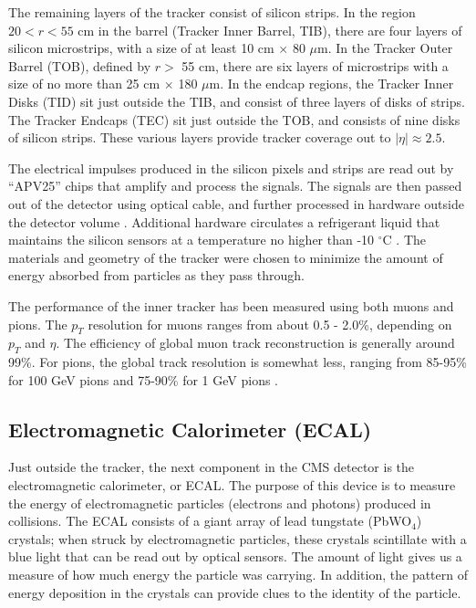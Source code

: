 The remaining layers of the tracker consist of silicon strips. In the
region $20 < r < 55$ cm in the barrel (Tracker Inner Barrel, TIB),
there are four layers of silicon
microstrips, with a size of at least 10 cm $\times$ 80 $\mu$m. In the
Tracker Outer Barrel (TOB), defined by $r >$ 55 cm, there are six
layers of microstrips with a size of no more than 25 cm $\times$
180 $\mu$m. In the endcap regions, the Tracker Inner Disks (TID) sit
just outside the TIB, and consist of three layers of disks of
strips. The Tracker Endcaps (TEC) sit just outside the TOB, and
consists of nine disks of silicon strips. These various layers provide
tracker coverage out to $|\eta| \approx 2.5$.

The electrical impulses produced in the silicon pixels and strips are
read out by ``APV25'' chips that amplify and process the signals. The
signals are then passed out of the detector using optical cable, and
further processed in hardware outside the detector volume
\cite{tdr}. Additional hardware circulates a refrigerant liquid that
maintains the silicon sensors at a temperature no higher than
-10 $^\circ$C \cite{accelexper}. The materials and geometry of the
tracker were chosen to minimize the amount of energy absorbed
from particles as they pass through.

The performance of the inner tracker has been measured using both
muons and pions. The $p_T$ resolution for muons ranges from about 0.5
- 2.0\%, depending on $p_T$ and $\eta$. The efficiency of
global muon track reconstruction is generally around 99\%. For pions,
the global track resolution is somewhat less, ranging from 85-95\% for
100 GeV pions and 75-90\% for 1 GeV pions \cite{tdr}.

\subsection{Electromagnetic Calorimeter (ECAL)}
\label{ssec:cms:components:ecal}

Just outside the tracker, the next component in the CMS
detector is the electromagnetic calorimeter, or ECAL. The purpose of
this device is to measure the energy of electromagnetic particles
(electrons and photons) produced in collisions. The ECAL consists
of a giant array of lead tungstate (PbWO$_4$) crystals; when struck by
electromagnetic particles, these crystals scintillate with a
blue light that can be read out by optical sensors. The amount of
light gives us a measure of how much energy the particle was
carrying. In addition, the pattern of energy deposition in the
crystals can provide clues to the identity of the particle.

